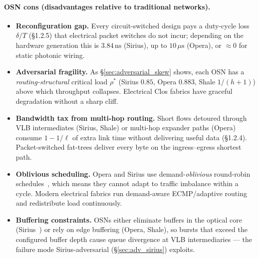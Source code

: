 \documentclass{article}
\begin{document}
    \paragraph{OSN cons (disadvantages relative to traditional networks).}
    \begin{itemize}
        \item \textbf{Reconfiguration gap.}  Every circuit-switched design pays a duty-cycle loss $\delta/T$ (\S1.2.5) that electrical packet switches do not incur; depending on the hardware generation this is $3.84\,\text{ns}$ (Sirius), up to $10\,\mu\text{s}$ (Opera), or $\approx 0$ for static photonic wiring.
        \item \textbf{Adversarial fragility.}  As \S\ref{sec:adversarial_skew} shows, each OSN has a \emph{routing-structural} critical load $\rho^*$ (Sirius $0.85$, Opera $0.883$, Shale $1/(h{+}1)$) above which throughput collapses.  Electrical Clos fabrics have graceful degradation without a sharp cliff.
        \item \textbf{Bandwidth tax from multi-hop routing.}  Short flows detoured through VLB intermediates (Sirius, Shale) or multi-hop expander paths (Opera) consume $1-1/\ell$ of extra link time without delivering useful data (\S1.2.4).  Packet-switched fat-trees deliver every byte on the ingress--egress shortest path.
        \item \textbf{Oblivious scheduling.}  Opera and Sirius use demand-\emph{oblivious} round-robin schedules~\cite{opera,sirius}, which means they cannot adapt to traffic imbalance within a cycle.  Modern electrical fabrics run demand-aware ECMP/adaptive routing and redistribute load continuously.
        \item \textbf{Buffering constraints.}  OSNs either eliminate buffers in the optical core (Sirius~\cite{sirius}) or rely on edge buffering (Opera, Shale), so bursts that exceed the configured buffer depth cause queue divergence at VLB intermediaries --- the failure mode Sirius-adversarial (\S\ref{sec:adv_sirius}) exploits.
    \end{itemize}
\end{document}
